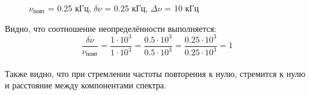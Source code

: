 \documentclass[a4paper,12pt]{article}
\begin{document}
\begin{enumerate}
\begin{figure}[h]
\begin{minipage}[h]{0.47\linewidth}
 $\nu_\text{повт}$  = 0.25 кГц, $\delta \nu$ = 0.25 кГц, $\Delta \nu$ = 10 кГц \\
\end{minipage}
\hfill
\caption{}
\label{ris:experimentalcorrelationsignals}
\end{figure}

Видно, что соотношение неопределённости выполняется:
$$ \frac{\delta \nu}{\nu_\text{повт}} = \frac{1\cdot10^3}{1\cdot10^3} = \frac{0.5\cdot10^3}{0.5\cdot10^3} = \frac{0.25\cdot10^3}{0.25\cdot10^3} = 1 $$\\

Также видно, что при стремлении частоты повторения к нулю, стремится к нулю и расстояние между компонентами спектра.

\end{enumerate}


















\newpage

\end{document}
